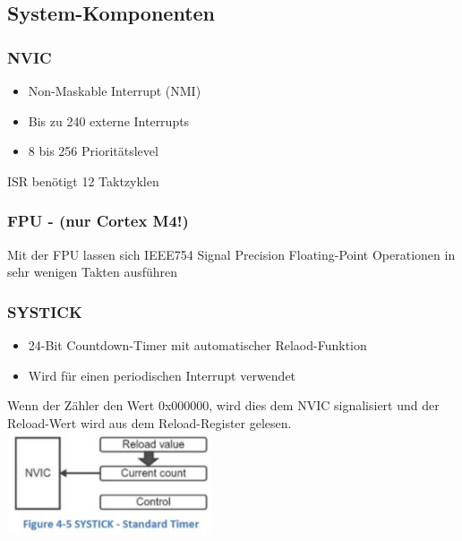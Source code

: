 \subsection{System-Komponenten}
\begin{multicols}{2}
\subsubsection{NVIC}
\begin{itemize}
    \item Non-Maskable Interrupt (NMI)
    \item Bis zu 240 externe Interrupts
    \item 8 bis 256 Prioritätslevel
\end{itemize}
\rightarrow ISR benötigt 12 Taktzyklen
\subsubsection{FPU - (nur Cortex M4!)}
Mit der FPU lassen sich IEEE754 Signal Precision Floating-Point Operationen in sehr wenigen Takten ausführen

\subsubsection{SYSTICK}
\begin{itemize}
    \item 24-Bit Countdown-Timer mit automatischer Relaod-Funktion
    \item Wird für einen periodischen Interrupt verwendet
\end{itemize}
Wenn der Zähler den Wert 0x000000, wird dies dem NVIC signalisiert und  der Reload-Wert wird aus dem Reload-Register gelesen.
\includegraphics[width=6cm]{images/NVIC}
\end{multicols}

